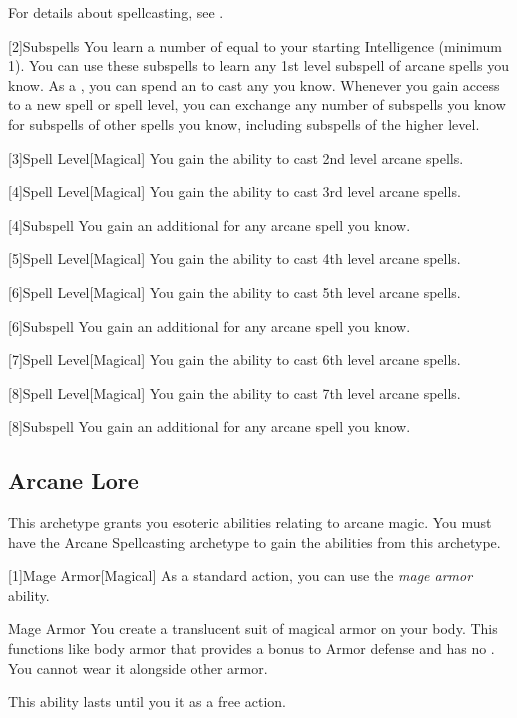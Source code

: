         For details about spellcasting, see .

        [2]{Subspells} You learn a number of  equal to your starting Intelligence  (minimum 1).
        You can use these subspells to learn any 1st level subspell of arcane spells you know.
        As a , you can spend an  to cast any  you know.
        Whenever you gain access to a new spell or spell level, you can exchange any number of subspells you know for subspells of other spells you know, including subspells of the higher level.

        [3]{Spell Level}[Magical] You gain the ability to cast 2nd level arcane spells.

        [4]{Spell Level}[Magical] You gain the ability to cast 3rd level arcane spells.

        [4]{Subspell} You gain an additional  for any arcane spell you know.

        [5]{Spell Level}[Magical] You gain the ability to cast 4th level arcane spells.

        [6]{Spell Level}[Magical] You gain the ability to cast 5th level arcane spells.

        [6]{Subspell} You gain an additional  for any arcane spell you know.

        [7]{Spell Level}[Magical] You gain the ability to cast 6th level arcane spells.

        [8]{Spell Level}[Magical] You gain the ability to cast 7th level arcane spells.

        [8]{Subspell} You gain an additional  for any arcane spell you know.

    \subsection{Arcane Lore}
        This archetype grants you esoteric abilities relating to arcane magic.
        You must have the Arcane Spellcasting archetype to gain the abilities from this archetype.

        [1]{Mage Armor}[Magical] As a standard action, you can use the \textit{mage armor} ability.
        \begin{ability}{Mage Armor}
            You create a translucent suit of magical armor on your body.
            This functions like body armor that provides a  bonus to Armor defense and has no .
            You cannot wear it alongside other armor.

            This ability lasts until you  it as a free action.
        \end{ability}

